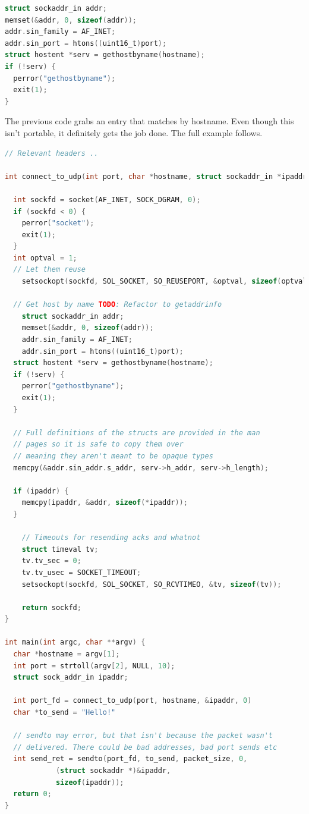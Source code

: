 \begin{lstlisting}[language=C]
struct sockaddr_in addr;
memset(&addr, 0, sizeof(addr));
addr.sin_family = AF_INET;
addr.sin_port = htons((uint16_t)port);
struct hostent *serv = gethostbyname(hostname);
if (!serv) {
  perror("gethostbyname");
  exit(1);
}
\end{lstlisting}

The previous code grabs an entry  that matches by hostname.
Even though this isn't portable, it definitely gets the job done.
The full example follows.

\begin{lstlisting}[language=C]
  // Relevant headers ..

int connect_to_udp(int port, char *hostname, struct sockaddr_in *ipaddr) {

  int sockfd = socket(AF_INET, SOCK_DGRAM, 0);
  if (sockfd < 0) {
    perror("socket");
    exit(1);
  }
  int optval = 1;
  // Let them reuse
	setsockopt(sockfd, SOL_SOCKET, SO_REUSEPORT, &optval, sizeof(optval));

  // Get host by name TODO: Refactor to getaddrinfo
	struct sockaddr_in addr;
	memset(&addr, 0, sizeof(addr));
	addr.sin_family = AF_INET;
	addr.sin_port = htons((uint16_t)port);
  struct hostent *serv = gethostbyname(hostname);
  if (!serv) {
    perror("gethostbyname");
    exit(1);
  }

  // Full definitions of the structs are provided in the man
  // pages so it is safe to copy them over
  // meaning they aren't meant to be opaque types
  memcpy(&addr.sin_addr.s_addr, serv->h_addr, serv->h_length);

  if (ipaddr) {
    memcpy(ipaddr, &addr, sizeof(*ipaddr));
  }

	// Timeouts for resending acks and whatnot
	struct timeval tv;
	tv.tv_sec = 0;
	tv.tv_usec = SOCKET_TIMEOUT;
	setsockopt(sockfd, SOL_SOCKET, SO_RCVTIMEO, &tv, sizeof(tv));

	return sockfd;
}

int main(int argc, char **argv) {
  char *hostname = argv[1];
  int port = strtoll(argv[2], NULL, 10);
  struct sock_addr_in ipaddr;

  int port_fd = connect_to_udp(port, hostname, &ipaddr, 0)
  char *to_send = "Hello!"

  // sendto may error, but that isn't because the packet wasn't
  // delivered. There could be bad addresses, bad port sends etc
  int send_ret = sendto(port_fd, to_send, packet_size, 0,
			(struct sockaddr *)&ipaddr,
			sizeof(ipaddr));
  return 0;
}
\end{lstlisting}

